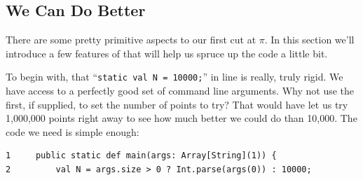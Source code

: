 \subsection{We Can Do Better}\label{subs:wcdb}

There are some pretty primitive aspects to our first cut at $\pi$.  In this section
we'll introduce a few features of \Xten{} that will help us spruce up the code a
little bit.

To begin with, that ``{\tt static val N = 10000;}'' in line   is really, truly rigid. 
We have access to a perfectly good set of command line arguments.  Why not use
the first, if supplied, to set the number of points to try?  That would have
let us try 1,000,000 points right away to see how much better we could do than
10,000. The code we need is simple enough:

\begin{verbatim}
1     public static def main(args: Array[String](1)) {
2         val N = args.size > 0 ? Int.parse(args(0)) : 10000;
\end{verbatim}

